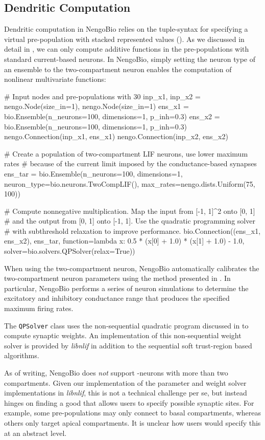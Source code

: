 \subsection{Dendritic Computation}
Dendritic computation in NengoBio relies on the tuple-syntax for specifying a virtual pre-population with stacked represented values ().
As we discussed in detail in , we can only compute additive functions in the pre-populations with standard current-based \LIF neurons.
In NengoBio, simply setting the neuron type of an ensemble to the two-compartment \LIF neuron enables the computation of nonlinear multivariate functions:
\begin{pythoncode}
# Input nodes and pre-populations with 30%
inp_x1, inp_x2 = nengo.Node(size_in=1), nengo.Node(size_in=1)
ens_x1 = bio.Ensemble(n_neurons=100, dimensions=1, p_inh=0.3)
ens_x2 = bio.Ensemble(n_neurons=100, dimensions=1, p_inh=0.3)
nengo.Connection(inp_x1, ens_x1)
nengo.Connection(inp_x2, ens_x2)

# Create a population of two-compartment LIF neurons, use lower maximum rates
# because of the current limit imposed by the conductance-based synapses
ens_tar = bio.Ensemble(n_neurons=100, dimensions=1,
                       neuron_type=bio.neurons.TwoCompLIF(),
                       max_rates=nengo.dists.Uniform(75, 100))

# Compute nonnegative multiplication. Map the input from [-1, 1]^2 onto [0, 1]
# and the output from [0, 1] onto [-1, 1]. Use the quadratic programming solver
# with subthreshold relaxation to improve performance.
bio.Connection((ens_x1, ens_x2), ens_tar,
               function=lambda x: 0.5 * (x[0] + 1.0) * (x[1] + 1.0) - 1.0,
               solver=bio.solvers.QPSolver(relax=True))
\end{pythoncode}
When using the two-compartment \LIF neuron, NengoBio automatically calibrates the two-compartment neuron parameters using the method presented in .
In particular, NengoBio performs a series of neuron simulations to determine the excitatory and inhibitory conductance range that produces the specified maximum firing rates.

The \texttt{QPSolver} class uses the non-sequential quadratic program discussed in  to compute synaptic weights.
An implementation of this non-sequential weight solver is provided by \emph{libnlif} in addition to the sequential soft trust-region based algorithms.

As of writing, NengoBio does \emph{not} support \nlif-neurons with more than two compartments.
Given our implementation of the parameter and weight solver implementations in \emph{libnlif}, this is not a technical challenge per se, but instead hinges on finding a good \API that allows users to specify possible synaptic sites.
For example, some pre-populations may only connect to basal compartments, whereas others only target apical compartments.
It is unclear how users would specify this at an abstract level.
